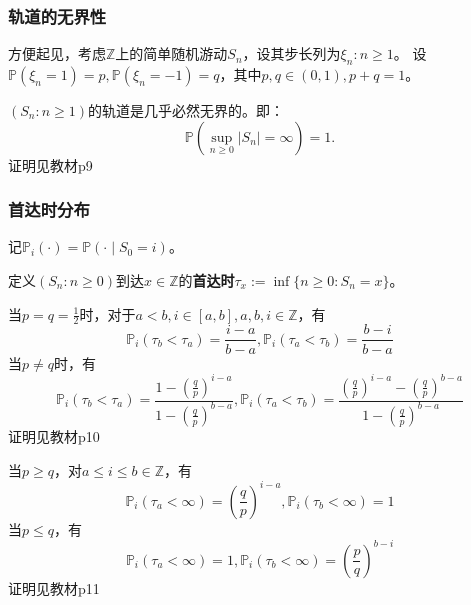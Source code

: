 \documentclass[main]{subfiles}
\begin{document}
\subsubsection{轨道的无界性}
方便起见，考虑\(\mathbb{Z}\)上的简单随机游动\(S_n\)，设其步长列为\(\xi_n:n \geq 1\)。
设\(\mathbb{P}(\xi_n=1)=p,\mathbb{P}(\xi_n=-1)=q\)，其中\(p,q \in (0,1),p+q=1\)。
\begin{theorem}\label{the:jihubirjwujp}
  \((S_n:n \geq 1)\)的轨道是几乎必然无界的。即：
  \begin{equation}
    \mathbb{P}(\sup_{n \geq 0}|S_n|=\infty)=1.
  \end{equation}
  证明见教材p9
\end{theorem}
\subsubsection{首达时分布}
\begin{definition}\label{def:Pi}
  记\(\mathbb{P}_i(\cdot)=\mathbb{P}(\cdot\mid S_0=i)\)。
\end{definition}

\begin{definition}\label{def:uzdaui}
  定义\((S_n:n \geq 0)\)到达\(x \in \mathbb{Z}\)的\textbf{首达时}\(\tau_x:=\inf \{n \geq 0:S_n=x\}\)。
\end{definition}
\begin{theorem}\label{the:122}
  当\(p=q=\frac{1}{2}\)时，对于\(a<b,i \in [a,b],a,b,i \in \mathbb{Z}\)，有
  \begin{equation}
    \mathbb{P}_i(\tau_b<\tau_a)=\frac{i-a}{b-a},\mathbb{P}_i(\tau_a<\tau_b)=\frac{b-i}{b-a}
  \end{equation}
  当\(p \neq q\)时，有
  \begin{equation}
    \mathbb{P}_i(\tau_b<\tau_a)=\frac{1-(\frac{q}{p})^{i-a}}{1-(\frac{q}{p})^{b-a}},
    \mathbb{P}_i(\tau_a<\tau_b)=\frac{(\frac{q}{p})^{i-a}-(\frac{q}{p})^{b-a}}{1-(\frac{q}{p})^{b-a}}
  \end{equation}
  证明见教材p10
\end{theorem}
\begin{theorem}\label{the:1.2.3}
  当\(p \geq q\)，对\(a \leq i \leq b \in \mathbb{Z}\)，有
  \begin{equation}
    \mathbb{P}_i(\tau_a<\infty)=(\frac{q}{p})^{i-a},\mathbb{P}_i(\tau_b<\infty)=1
  \end{equation}
  当\(p \leq q\)，有
  \begin{equation}
    \mathbb{P}_i(\tau_a<\infty)=1,\mathbb{P}_i(\tau_b<\infty)=(\frac{p}{q})^{b-i}
  \end{equation}
  证明见教材p11
\end{theorem}
\end{document}
